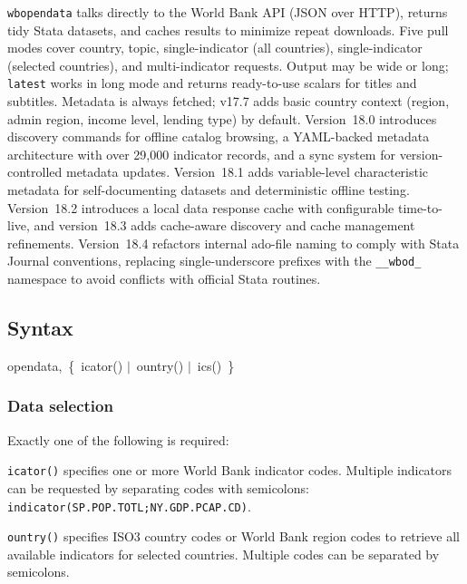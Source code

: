 \documentclass[bib]{statapress}
\begin{document}
\texttt{wbopendata} talks directly to the World Bank API (JSON over HTTP), returns tidy Stata datasets, and caches results to minimize repeat downloads. Five pull modes cover country, topic, single-indicator (all countries), single-indicator (selected countries), and multi-indicator requests. Output may be wide or long; \texttt{latest} works in long mode and returns ready-to-use scalars for titles and subtitles. Metadata is always fetched; v17.7 adds basic country context (region, admin region, income level, lending type) by default. Version~18.0 introduces discovery commands for offline catalog browsing, a YAML-backed metadata architecture with over 29{,}000 indicator records, and a sync system for version-controlled metadata updates. Version~18.1 adds variable-level characteristic metadata for self-documenting datasets and deterministic offline testing. Version~18.2 introduces a local data response cache with configurable time-to-live, and version~18.3 adds cache-aware discovery and cache management refinements. Version~18.4 refactors internal ado-file naming to comply with Stata Journal conventions, replacing single-underscore prefixes with the \texttt{\_\_wbod\_} namespace to avoid conflicts with official Stata routines.

\subsection{Syntax}

\begin{stsyntax}
opendata,\
\{\
icator(\ststring) $\mid$\
ountry(\ststring) $\mid$\
ics(\ststring)\/\
\}\
\end{stsyntax}

\subsubsection*{Data selection}

Exactly one of the following is required:

\hangpara
\texttt{icator(\ststring)} specifies one or more World Bank indicator codes. Multiple indicators can be requested by separating codes with semicolons:\newline
\mbox{}\quad\texttt{indicator(SP.POP.TOTL;NY.GDP.PCAP.CD)}.

\hangpara
\texttt{ountry(\ststring)} specifies ISO3 country codes or World Bank region codes to retrieve all available indicators for selected countries. Multiple codes can be separated by semicolons.
\end{document}
